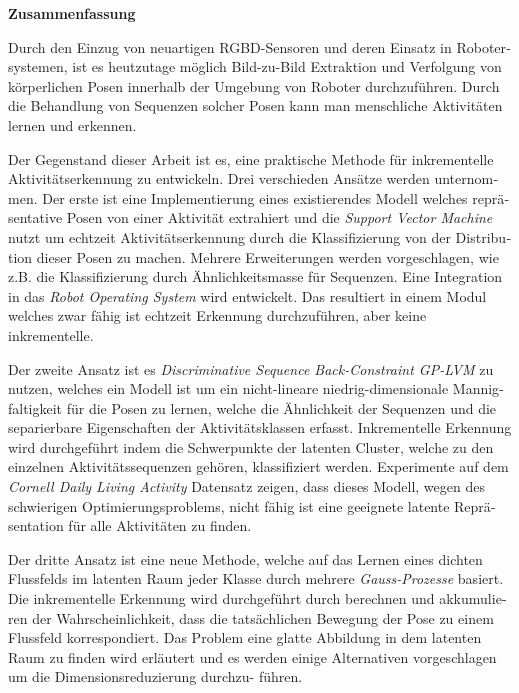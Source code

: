 



\cleardoublepage



\vspace*{2cm}
\begin{center}
{\Large \bf Zusammenfassung}
\end{center}
\vspace{1cm}

\begin{otherlanguage}{ngerman}
Durch den Einzug von neuartigen RGBD-Sensoren und deren Einsatz in Robotersystemen, ist es heutzutage m\"oglich Bild-zu-Bild Extraktion und Verfolgung von
k\"orperlichen Posen innerhalb der Umgebung von Roboter durchzuf\"uhren. Durch die Behandlung von Sequenzen solcher Posen kann man menschliche Aktivit\"aten lernen und erkennen.

Der Gegenstand dieser Arbeit ist es, eine praktische Methode f\"ur inkrementelle Aktivit\"atserkennung zu entwickeln. Drei verschieden Ans\"atze werden unternommen. Der erste ist eine Implementierung eines existierendes Modell welches repr\"asentative Posen von einer Aktivit\"at extrahiert und die \textit{Support Vector Machine} nutzt um echtzeit Aktivit\"atserkennung durch die Klassifizierung von der Distribution dieser Posen zu machen.
Mehrere Erweiterungen werden vorgeschlagen, wie z.B. die Klassifizierung durch \"Ahnlichkeitsmasse f\"ur Sequenzen. Eine Integration in das \textit{Robot Operating System} wird entwickelt. Das resultiert in einem Modul welches zwar f\"ahig ist echtzeit Erkennung durchzuf\"uhren, aber keine inkrementelle.

Der zweite Ansatz ist es \textit{Discriminative Sequence Back-Constraint GP-LVM} zu nutzen, welches ein Modell ist um ein nicht-lineare niedrig-dimensionale Mannigfaltigkeit f\"ur die Posen zu lernen, welche die \"Ahnlichkeit der Sequenzen und die separierbare Eigenschaften der Aktivit\"atsklassen erfasst. Inkrementelle Erkennung wird durchgef\"uhrt indem die Schwerpunkte der latenten Cluster, welche zu den einzelnen Aktivit\"atssequenzen geh\"oren, klassifiziert werden. Experimente auf dem \textit{Cornell Daily Living Activity} Datensatz zeigen, dass dieses Modell, wegen des schwierigen Optimierungsproblems, nicht f\"ahig ist eine geeignete latente Repr\"asentation f\"ur alle Aktivit\"aten zu finden. 

Der dritte Ansatz ist eine neue Methode, welche auf das Lernen eines dichten Flussfelds im latenten Raum jeder Klasse durch mehrere \textit{Gauss-Prozesse} basiert. Die inkrementelle Erkennung wird durchgef\"uhrt durch berechnen und akkumulieren der Wahrscheinlichkeit, dass die tats\"achlichen Bewegung der Pose zu einem Flussfeld korrespondiert. Das Problem eine glatte Abbildung in dem latenten Raum zu finden wird erl\"autert und es werden einige Alternativen vorgeschlagen um die Dimensionsreduzierung durchzu- f\"uhren.
\end{otherlanguage}
